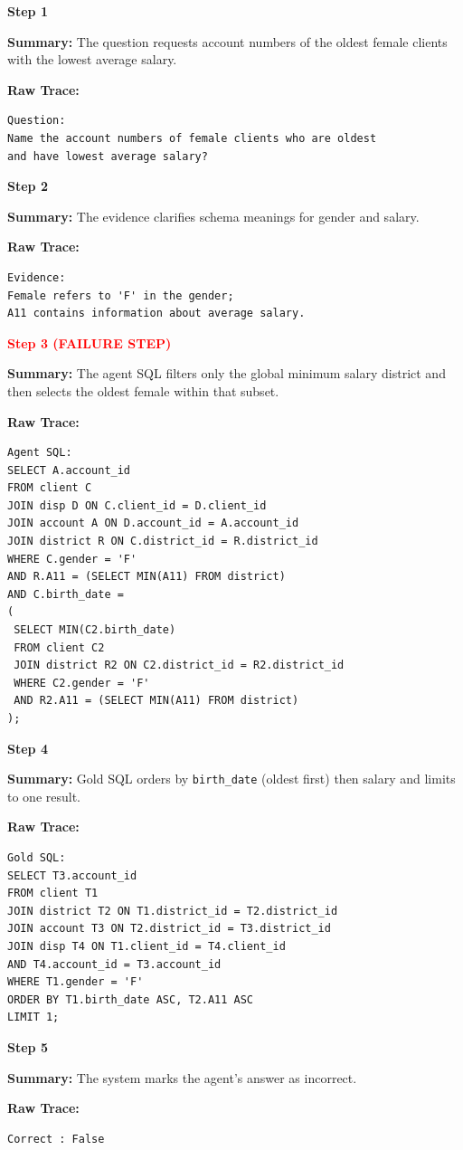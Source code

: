 \documentclass[11pt]{article}
\begin{document}
\begin{tcolorbox}[
breakable,
colback=customwhite,
colframe=customred,
title=Instruction,
fontupper=\fontfamily{pcr}\selectfont\scriptsize
]

\textbf{Step 1}

\textbf{Summary:}  
The question requests account numbers of the oldest female clients with the lowest average salary.

\textbf{Raw Trace:}
\begin{verbatim}
Question:
Name the account numbers of female clients who are oldest
and have lowest average salary?
\end{verbatim}

\medskip
\textbf{Step 2}

\textbf{Summary:}  
The evidence clarifies schema meanings for gender and salary.

\textbf{Raw Trace:}
\begin{verbatim}
Evidence:
Female refers to 'F' in the gender;
A11 contains information about average salary.
\end{verbatim}

\medskip
\textbf{\textcolor{red}{Step 3 (FAILURE STEP)}}

\textbf{Summary:}  
The agent SQL filters only the global minimum salary district and then selects the oldest female within that subset.

\textbf{Raw Trace:}
\begin{verbatim}
Agent SQL:
SELECT A.account_id
FROM client C
JOIN disp D ON C.client_id = D.client_id
JOIN account A ON D.account_id = A.account_id
JOIN district R ON C.district_id = R.district_id
WHERE C.gender = 'F'
AND R.A11 = (SELECT MIN(A11) FROM district)
AND C.birth_date =
(
 SELECT MIN(C2.birth_date)
 FROM client C2
 JOIN district R2 ON C2.district_id = R2.district_id
 WHERE C2.gender = 'F'
 AND R2.A11 = (SELECT MIN(A11) FROM district)
);
\end{verbatim}

\medskip
\textbf{Step 4}

\textbf{Summary:}  
Gold SQL orders by \texttt{birth\_date} (oldest first) then salary and limits to one result.

\textbf{Raw Trace:}
\begin{verbatim}
Gold SQL:
SELECT T3.account_id
FROM client T1
JOIN district T2 ON T1.district_id = T2.district_id
JOIN account T3 ON T2.district_id = T3.district_id
JOIN disp T4 ON T1.client_id = T4.client_id
AND T4.account_id = T3.account_id
WHERE T1.gender = 'F'
ORDER BY T1.birth_date ASC, T2.A11 ASC
LIMIT 1;
\end{verbatim}

\medskip
\textbf{Step 5}

\textbf{Summary:}  
The system marks the agent's answer as incorrect.

\textbf{Raw Trace:}
\begin{verbatim}
Correct : False
\end{verbatim}

\end{tcolorbox}
\end{document}
